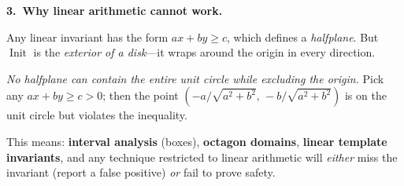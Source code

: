 \documentclass[10pt,a4paper]{article}
\newcommand{\Init}{\operatorname{Init}}
\begin{document}
\vspace{3pt}
\begin{minipage}[t]{0.52\textwidth}
\begin{mdframed}[linecolor=red!60,backgroundcolor=red!4,roundcorner=2pt,linewidth=0.7pt]
\textbf{3.\ Why linear arithmetic cannot work.}

\vspace{1pt}
Any linear invariant has the form $ax + by \geq c$, which defines a
\emph{halfplane}.  But $\Init$ is the \emph{exterior of a disk}---it
wraps around the origin in every direction.

\vspace{2pt}
\emph{No halfplane can contain the entire unit circle while excluding
the origin.}  Pick any $ax + by \geq c > 0$; then the point
$(-a/\!\sqrt{a^2\!+\!b^2},\, -b/\!\sqrt{a^2\!+\!b^2})$ is on the
unit circle but violates the inequality.

\vspace{2pt}
This means: \textbf{interval analysis} (boxes), \textbf{octagon
domains}, \textbf{linear template invariants}, and any technique
restricted to linear arithmetic will \emph{either} miss the invariant
(report a false positive) \emph{or} fail to prove safety.
\end{mdframed}
\end{minipage}%
\hfill
\end{document}
